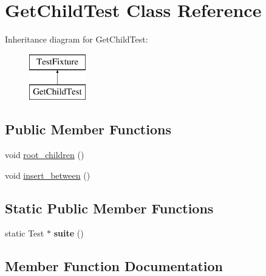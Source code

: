 \hypertarget{class_get_child_test}{}\section{Get\+Child\+Test Class Reference}
\label{class_get_child_test}
Inheritance diagram for Get\+Child\+Test\+:\begin{figure}[H]
\begin{center}
\leavevmode
\includegraphics[height=2.000000cm]{class_get_child_test}
\end{center}
\end{figure}
\subsection*{Public Member Functions}
\begin{DoxyCompactItemize}
\item 
void \hyperlink{class_get_child_test_a1385e9059ba424b000d5e15ab28bd19b}{root\+\_\+children} ()
\item 
void \hyperlink{class_get_child_test_a3bbc21e060e29cdcc15708c2f3d7d8d1}{insert\+\_\+between} ()
\end{DoxyCompactItemize}
\subsection*{Static Public Member Functions}
\begin{DoxyCompactItemize}
\item 
\mbox{\label{class_get_child_test_a4af2b9944cee3a7bf9f8a9ddc1729e47}} 
static Test $\ast$ {\bfseries suite} ()
\end{DoxyCompactItemize}


\subsection{Member Function Documentation}
\mbox{\label{class_get_child_test_a3bbc21e060e29cdcc15708c2f3d7d8d1}} 
